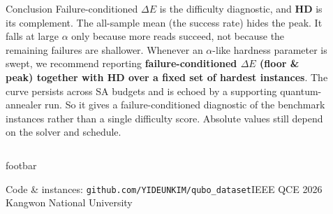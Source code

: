 \documentclass[final]{beamer}
\newcommand{\sacol}[1]{{\color{saBlue}\textbf{#1}}}
\newcommand{\qpucol}[1]{{\color{qpuRed}\textbf{#1}}}
\newcommand{\bnum}[1]{\smash{\raisebox{-0.27cm}{\tikz\node[circle,fill=white,text=deepblue,inner sep=1pt,minimum size=0.82cm,font=\normalsize\bfseries]{#1};}}\hspace{0.2cm}}
\newlength{\sepwid}\newlength{\onecolwid}\newlength{\fullwid}
\begin{document}
\begin{frame}[t]
\begin{columns}[t]
\begin{column}{\onecolwid}
\end{column}
\begin{column}{\sepwid}\end{column}
\end{columns}

\vskip0.6cm
\begin{columns}[t]
\begin{column}{\sepwid}\end{column}
\begin{column}{\fullwid}
\begin{block}{\bnum{10}Conclusion}
\RaggedRight\large
Failure-conditioned \sacol{$\Delta E$} is the difficulty diagnostic, and \qpucol{HD} is its complement. The all-sample mean (the success rate) hides the peak. It falls at large $\alpha$ only because more reads succeed, not because the remaining failures are shallower. Whenever an $\alpha$-like hardness parameter is swept, we recommend reporting \textbf{failure-conditioned $\Delta E$ (floor \& peak) together with HD over a fixed set of hardest instances}. The curve persists across SA budgets and is echoed by a supporting quantum-annealer run. So it gives a failure-conditioned diagnostic of the benchmark instances rather than a single difficulty score. Absolute values still depend on the solver and schedule.
\end{block}
\end{column}
\begin{column}{\sepwid}\end{column}
\end{columns}

\vskip0.55cm
\begin{columns}[t]
\begin{column}{\sepwid}\end{column}
\begin{column}{\fullwid}
  \begin{beamercolorbox}[wd=\fullwid,sep=0pt,rounded=true]{footbar}
    \hspace{1.3cm}\begin{minipage}[c][1.45cm][c]{\dimexpr\fullwid-2.6cm\relax}
      {\large Code \& instances: \texttt{github.com/YIDEUNKIM/qubo\_dataset}}\hfill{\large\color{accentlight}IEEE QCE 2026 \quad\textbullet\quad Kangwon National University}
    \end{minipage}\hspace{1.3cm}
  \end{beamercolorbox}
\end{column}
\begin{column}{\sepwid}\end{column}
\end{columns}

\end{frame}
\end{document}
